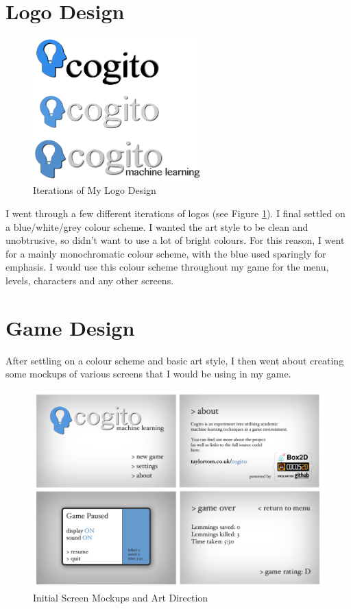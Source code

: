 \documentclass[a4paper,oneside]{report}
\begin{document}
\section{Logo Design}
	
\begin{figure}
  \centering
    \includegraphics[width=65mm]{sources/images/cogito_logo1}
    \caption{Iterations of My Logo Design}
    \label{fig:Logos}
\end{figure}
	
I went through a few different iterations of logos (see Figure \ref{fig:Logos}). I final settled on a blue/white/grey colour scheme. I wanted the art style to be clean and unobtrusive, so didn't want to use a lot of bright colours. For this reason, I went for a mainly monochromatic colour scheme, with the blue used sparingly for emphasis. I would use this colour scheme throughout my game for the menu, levels, characters and any other screens.

\section{Game Design}

After settling on a colour scheme and basic art style, I then went about creating some mockups of various screens that I would be using in my game.
	
\begin{figure}[h!]
  \centering
    \includegraphics[width=140mm]{sources/images/Screens}
    \caption{Initial Screen Mockups and Art Direction}
\end{figure}
\end{document}
